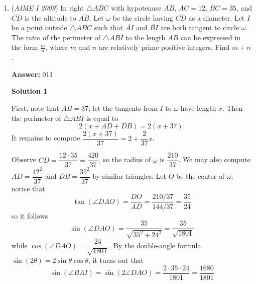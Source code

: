 \begin{enumerate}
\textbf{Solution 6 (Easier Shoelace)}

Dividing by 41 on both sides yields 
 \[x+ \frac{y}{41} = 49\]

 and because the result is an integer, $\frac{y}{41} = z$ and thus we have
 \[x+z = 49\]and through stars-and-bars the number of ways to count the following integer pairs greater than or equal to 0 is simply just $\binom{50}{1} = 50$. 

 From here, shoelace on the coordinates $(0,0)$, $P(x_1, y_1)$, $Q(x_2,y_2)$ results in $\frac{1}{2} | x_1y_2 - y_1x_2 |$. Also notice that for the resulting area to be an integer we must have that $x_1y_2 \equiv y_1x_2 \pmod{2}$. The only way this is possible is if both $x_1y_2 - y_1x_2$ are either even or odd. There are 25 pairs of odd numbers, and 25 pairs of even numbers out of the 50 possible stars-and-bars cases. Note that choosing the two numbers themselves to give to the coordinates of $P$ and $Q$ respectively make the triangle distinct as order does not matter. Thus the answer is just the number of ways to choose two even coordinates for one of the four distinct values and the remainder is for one of the odd coordinates, and thus our answer is just $2(\binom{25}{2}) = \boxed{600}$.

 


	\item (\textit{AIME I 2009}) In right $\triangle ABC$ with hypotenuse $\overline{AB}$, $AC = 12$, $BC = 35$, and $\overline{CD}$ is the altitude to $\overline{AB}$. Let $\omega$ be the circle having $\overline{CD}$ as a diameter. Let $I$ be a point outside $\triangle ABC$ such that $\overline{AI}$ and $\overline{BI}$ are both tangent to circle $\omega$. The ratio of the perimeter of $\triangle ABI$ to the length $AB$ can be expressed in the form $\frac {m}{n}$, where $m$ and $n$ are relatively prime positive integers. Find $m + n$.


 
 \textbf{Answer: }011



\textbf{Solution 1}

First, note that $AB=37$; let the tangents from $I$ to $\omega$ have length $x$. Then the perimeter of $\triangle ABI$ is equal to 
 \[2(x+AD+DB)=2(x+37).\] It remains to compute $\dfrac{2(x+37)}{37}=2+\dfrac{2}{37}x$.

 Observe $CD=\dfrac{12\cdot 35}{37}=\dfrac{420}{37}$, so the radius of $\omega$ is $\dfrac{210}{37}$. We may also compute $AD=\dfrac{12^{2}}{37}$ and $DB=\dfrac{35^{2}}{37}$ by similar triangles. Let $O$ be the center of $\omega$; notice that 
 \[\tan(\angle DAO)=\dfrac{DO}{AD}=\dfrac{210/37}{144/37}=\dfrac{35}{24}\] so it follows 
 \[\sin(\angle DAO)=\dfrac{35}{\sqrt{35^{2}+24^{2}}}=\dfrac{35}{\sqrt{1801}}\] while $\cos(\angle DAO)=\dfrac{24}{\sqrt{1801}}$. By the double-angle formula $\sin(2\theta)=2\sin\theta\cos\theta$, it turns out that 
 \[\sin(\angle BAI)=\sin(2\angle DAO)=\dfrac{2\cdot 35\cdot 24}{1801}=\dfrac{1680}{1801}\]


\end{enumerate}
